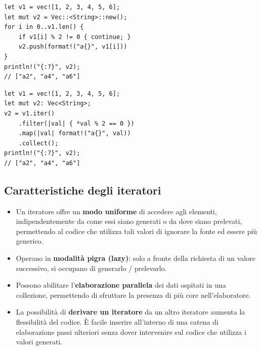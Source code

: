 \begin{center}
  \begin{minipage}{0.48\linewidth}
    \begin{tcolorbox}[title=Approccio Imperativo]
      \begin{verbatim}
let v1 = vec![1, 2, 3, 4, 5, 6]; 
let mut v2 = Vec::<String>::new(); 
for i in 0..v1.len() { 
    if v1[i] % 2 != 0 { continue; } 
    v2.push(format!("a{}", v1[i])) 
} 
println!("{:?}", v2); 
// ["a2", "a4", "a6"]
        \end{verbatim}
    \end{tcolorbox}
  \end{minipage}%
  \hfill
  \begin{minipage}{0.48\linewidth}
    \begin{tcolorbox}[title=Approccio Funzionale (Iteratori)]
      \begin{verbatim}
let v1 = vec![1, 2, 3, 4, 5, 6]; 
let mut v2: Vec<String>; 
v2 = v1.iter() 
    .filter(|val| { *val % 2 == 0 }) 
    .map(|val| format!("a{}", val)) 
    .collect(); 
println!("{:?}", v2); 
// ["a2", "a4", "a6"]
        \end{verbatim}
    \end{tcolorbox}
  \end{minipage}
\end{center}

\subsection{Caratteristiche degli iteratori}
\begin{itemize}
  \item Un iteratore offre un \textbf{modo uniforme} di accedere agli elementi, indipendentemente da come essi
        siano generati o da dove siano prelevati, permettendo al codice che utilizza tali valori di ignorare la
        fonte ed essere più generico.
  \item Operano in \textbf{modalità pigra (lazy)}: solo a fronte della richiesta di un valore successivo, si
        occupano di generarlo / prelevarlo.
  \item Possono abilitare l'\textbf{elaborazione parallela} dei dati ospitati in una collezione, permettendo di
        sfruttare la presenza di più core nell'elaboratore.
  \item La possibilità di \textbf{derivare un iteratore} da un altro iteratore aumenta la flessibilità del codice.
        È facile inserire all'interno di una catena di elaborazione passi ulteriori senza dover intervenire sul
        codice che utilizza i valori generati.
\end{itemize}

